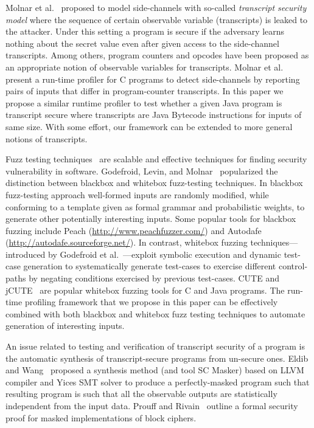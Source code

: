 
Molnar et al.~\cite{Molnar05} proposed to model side-channels with
so-called \emph{transcript security model} where the sequence of certain
observable variable (transcripts) is leaked to the attacker.
Under this setting a program is secure if the adversary learns nothing about the
secret value even after given access to the side-channel transcripts.
Among others, program counters and opcodes have been proposed as an appropriate
notion of observable variables for transcripts.
Molnar et al.~\cite{Molnar05} present a run-time profiler for C programs to
detect side-channels by reporting pairs of inputs that differ in program-counter
transcripts.
In this paper we propose a similar runtime profiler to test whether a given
Java program is transcript secure where transcripts are Java Bytecode
instructions for inputs of same size.
With some effort, our framework can be extended to more general notions of
transcripts.

Fuzz testing techniques~\cite{God12} are scalable and effective techniques for finding security
vulnerability in software.
Godefroid, Levin, and Molnar~\cite{God12} popularized the distinction between
blackbox and whitebox fuzz-testing techniques.
In blackbox fuzz-testing approach well-formed inputs are randomly modified,
while conforming to a template given as formal grammar and probabilistic
weights, to generate other potentially interesting inputs.  
Some popular tools for blackbox fuzzing include Peach 
(\url{http://www.peachfuzzer.com/}) and Autodafe
(\url{http://autodafe.sourceforge.net/}).
In contrast, whitebox fuzzing techniques---introduced by Godefroid et
al.~\cite{God12,GKS05}---exploit symbolic execution and dynamic test-case generation
to systematically generate test-cases to exercise different control-paths by
negating conditions exercised by previous test-cases.
CUTE and jCUTE~\cite{Sen2006} are popular whitebox fuzzing tools for C and Java
programs. 
The run-time profiling framework that we propose in this paper can be
effectively combined with both blackbox and whitebox fuzz testing techniques to
automate generation of interesting inputs.

An issue related to testing and verification of transcript security of a program
is the automatic synthesis of transcript-secure programs from un-secure ones.
Eldib and Wang~\cite{EW14} proposed a synthesis method (and tool SC Masker)
based on LLVM compiler and Yices SMT solver to produce a perfectly-masked
program such that resulting program is such that all the observable outputs are
statistically independent from the input data. 
Prouff and Rivain~\cite{PR13} outline a formal security proof for masked
implementations of block ciphers.      


